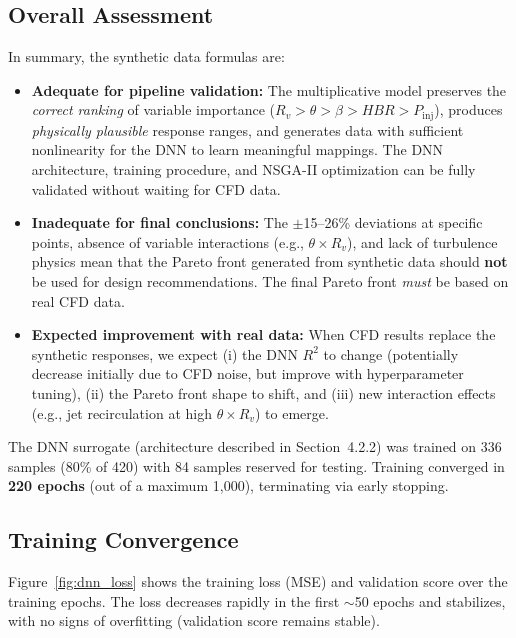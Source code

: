 \documentclass[12pt, a4paper]{report}
\begin{document}
\subsection{Overall Assessment}

\noindent In summary, the synthetic data formulas are:

\begin{itemize}
    \item \textbf{Adequate for pipeline validation:} The multiplicative model preserves the \textit{correct ranking} of variable importance ($R_v > \theta > \beta > HBR > P_{\text{inj}}$), produces \textit{physically plausible} response ranges, and generates data with sufficient nonlinearity for the DNN to learn meaningful mappings. The DNN architecture, training procedure, and NSGA-II optimization can be fully validated without waiting for CFD data.
    \item \textbf{Inadequate for final conclusions:} The $\pm$15--26\% deviations at specific points, absence of variable interactions (e.g., $\theta \times R_v$), and lack of turbulence physics mean that the Pareto front generated from synthetic data should \textbf{not} be used for design recommendations. The final Pareto front \textit{must} be based on real CFD data.
    \item \textbf{Expected improvement with real data:} When CFD results replace the synthetic responses, we expect (i) the DNN $R^2$ to change (potentially decrease initially due to CFD noise, but improve with hyperparameter tuning), (ii) the Pareto front shape to shift, and (iii) new interaction effects (e.g., jet recirculation at high $\theta \times R_v$) to emerge.
\end{itemize}



The DNN surrogate (architecture described in Section~4.2.2) was trained on 336 samples (80\% of 420) with 84 samples reserved for testing. Training converged in \textbf{220 epochs} (out of a maximum 1{,}000), terminating via early stopping.

\subsection{Training Convergence}

Figure~\ref{fig:dnn_loss} shows the training loss (MSE) and validation score over the training epochs. The loss decreases rapidly in the first $\sim$50 epochs and stabilizes, with no signs of overfitting (validation score remains stable).
\end{document}
